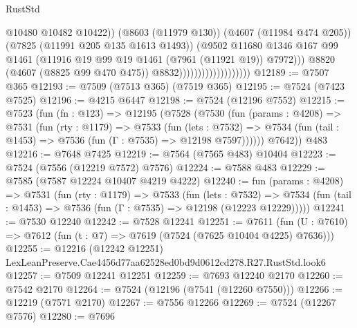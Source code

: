 \begin{lexlean}{RustStd}
\begin{coremodule}
                                                @10480
                                                @10482
                                                @10422))
                                            (@8603 (@11979 @130))
                                            (@4607 (@11984 @474 @205))
                                            (@7825 (@11991 @205 @135 @1613 @1493))
                                            (@9502
                                              @11680
                                              @1346
                                              @167
                                              @99
                                              @1461
                                              (@11916
                                                @19
                                                @99
                                                @19
                                                @1461
                                                (@7961 (@11921 @19))
                                                @7972)))
                                          @8820
                                          (@4607 (@8825 @99 @470 @475))
                                          @8832)))))))))))))))))))
@12189 := @7507 @365
@12193 := @7509 (@7513 @365) (@7519 @365)
@12195 := @7524 (@7423 @7525)
@12196 := @4215 @6447
@12198 := @7524 (@12196 @7552)
@12215 := @7523
    (fun (fn : @123) =>
    @12195
      (@7528
        (@7530
          (fun (params : @4208) =>
          @7531
            (fun (rty : @1179) =>
            @7533
              (fun (lets : @7532) =>
              @7534 (fun (tail : @1453) => @7536 (fun (Γ : @7535) => @12198 @7597))))))
        @7642))
    @483
@12216 := @7648 @7425
@12219 := @7564 (@7565 @483) @10404
@12223 := @7524 (@7556 (@12219 @7572) @7576)
@12224 := @7588 @483
@12229 := @7585 (@7587 @12224 @10407 @4219 @4222)
@12240 := fun (params : @4208) =>
  @7531
    (fun (rty : @1179) =>
    @7533
      (fun (lets : @7532) =>
      @7534 (fun (tail : @1453) => @7536 (fun (Γ : @7535) => @12198 (@12223 @12229)))))
@12241 := @7530 @12240
@12242 := @7528 @12241
@12251 := @7611
    (fun (U : @7610) => @7612 (fun (t : @7) => @7619 (@7524 (@7625 @10404 @4225) @7636)))
@12255 := @12216 (@12242 @12251) LexLeanPreserve.Cae4456d77aa62528ed0bd9d0612cd278.R27.RustStd.look6
@12257 := @7509 @12241 @12251
@12259 := @7693 @12240 @2170
@12260 := @7542 @2170
@12264 := @7524 (@12196 (@7541 (@12260 @7550)))
@12266 := @12219 (@7571 @2170)
@12267 := @7556 @12266
@12269 := @7524 (@12267 @7576)
@12280 := @7696

\end{coremodule}
\end{lexlean}
